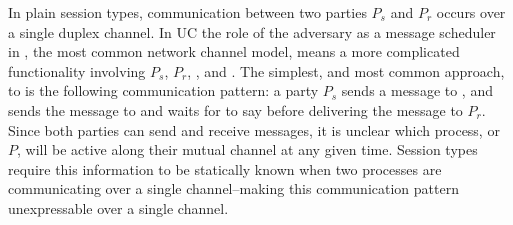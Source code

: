 In plain session types, communication between two parties $P_s$ and $P_r$ occurs over a single duplex channel.
In UC the role of the adversary as a message scheduler in \Fauth, the most common network channel model, means a more complicated functionality involving $P_s$, $P_r$, \F, and \A. 
The simplest, and most common approach, to \Fauth is the following communication pattern: a party $P_s$ sends a message to \Fauth, and \Fauth sends the message to \A and waits for \A to say  before delivering the message to $P_r$.
Since both parties can send and receive messages, it is unclear which process, \Fauth or $P$, will be active along their mutual channel at any given time.
Session types require this information to be statically known when two processes are communicating over a single channel--making this communication pattern unexpressable over a single channel.

